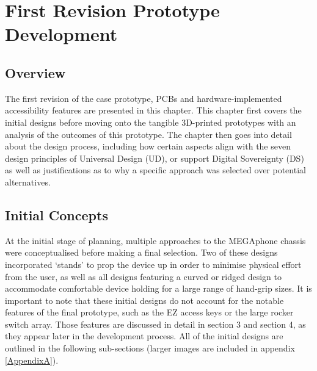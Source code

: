 
\chapter{First Revision Prototype Development} %

\label{Chapter4} %

\section{Overview} %

The first revision of the case prototype, PCBs and hardware-implemented accessibility features are presented in this chapter.
This chapter first covers the initial designs before moving onto the tangible 3D-printed prototypes with an analysis of the outcomes of this prototype.
The chapter then goes into detail about the design process, including how certain aspects align with the seven design principles of Universal Design (UD), or support Digital Sovereignty (DS) as well as justifications as to why a specific approach was selected over potential alternatives.

\section{Initial Concepts}

At the initial stage of planning, multiple approaches to the MEGAphone chassis were conceptualised before making a final selection.
Two of these designs incorporated ‘stands’ to prop the device up in order to minimise physical effort from the user, as well as all designs featuring a curved or ridged design to accommodate comfortable device holding for a large range of hand-grip sizes. 
It is important to note that these initial designs do not account for the notable features of the final prototype, such as the EZ access keys or the large rocker switch array.
Those features are discussed in detail in section 3 and section 4, as they appear later in the development process.
All of the initial designs are outlined in the following sub-sections (larger images are included in appendix \ref{AppendixA}).

